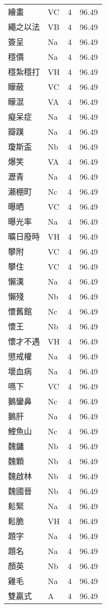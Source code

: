 \documentclass[twocolumn]{book}
\begin{document}
\begin{supertabular}{llrr}
繪畫 & VC & 4 &  96.49\\
繩之以法 & VB & 4 &  96.49\\
簽呈 & Na & 4 &  96.49\\
穩價 & Na & 4 &  96.49\\
穩紮穩打 & VH & 4 &  96.49\\
矇蔽 & VC & 4 &  96.49\\
矇混 & VA & 4 &  96.49\\
癡呆症 & Na & 4 &  96.49\\
瓣蹼 & Na & 4 &  96.49\\
瓊斯盃 & Nb & 4 &  96.49\\
爆笑 & VA & 4 &  96.49\\
瀝青 & Na & 4 &  96.49\\
瀨棚町 & Nc & 4 &  96.49\\
曝晒 & VC & 4 &  96.49\\
曝光率 & Na & 4 &  96.49\\
曠日廢時 & VH & 4 &  96.49\\
攀附 & VC & 4 &  96.49\\
攀住 & VC & 4 &  96.49\\
懶漢 & Na & 4 &  96.49\\
懶殘 & Nb & 4 &  96.49\\
懷舊館 & Nc & 4 &  96.49\\
懷王 & Nb & 4 &  96.49\\
懷才不遇 & VH & 4 &  96.49\\
懲戒權 & Na & 4 &  96.49\\
壞血病 & Na & 4 &  96.49\\
嚥下 & VC & 4 &  96.49\\
鵝鑾鼻 & Nc & 4 &  96.49\\
鵝肝 & Na & 4 &  96.49\\
鯉魚山 & Nc & 4 &  96.49\\
魏鏞 & Nb & 4 &  96.49\\
魏顆 & Nb & 4 &  96.49\\
魏啟林 & Nb & 4 &  96.49\\
魏國晉 & Nb & 4 &  96.49\\
鬆緊 & Na & 4 &  96.49\\
鬆脆 & VH & 4 &  96.49\\
題字 & Na & 4 &  96.49\\
題名 & Na & 4 &  96.49\\
顏英 & Nb & 4 &  96.49\\
雞毛 & Na & 4 &  96.49\\
雙贏式 & A & 4 &  96.49\\

\end{supertabular}
\end{document}
